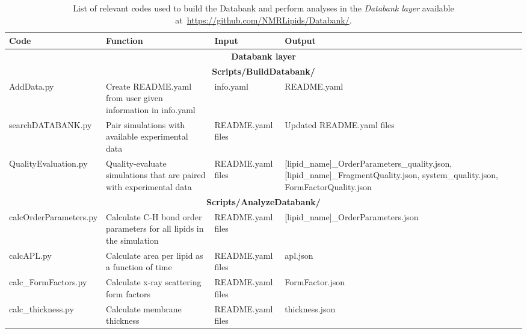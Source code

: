 \documentclass[fleqn,10pt]{wlscirepSI}
\begin{document}
\begin{table}[!h]
    \centering
    \begin{tabular}{p{3.0cm}  p{5.0cm}  p{3.0cm}  p{4.0cm}}
        Code & Function & Input & Output \\
        \hline
        \multicolumn{4}{c}{ {\bf Databank layer}}\\
        \hline
        \multicolumn{4}{c}{ {\bf Scripts/BuildDatabank/ }}\\
         AddData.py & Create README.yaml from user given information in info.yaml  & info.yaml & README.yaml \\
         searchDATABANK.py & Pair simulations with available experimental data  & README.yaml files & Updated README.yaml files \\
         QualityEvaluation.py & Quality-evaluate simulations that are paired with experimental data  & README.yaml files & [lipid\_name]\_OrderParameters\_quality.json, [lipid\_name]\_FragmentQuality.json, system\_quality.json, FormFactorQuality.json \\
         \multicolumn{4}{c}{ {\bf Scripts/AnalyzeDatabank/ }}\\
         calcOrderParameters.py & Calculate C-H bond order parameters for all lipids in the simulation & README.yaml files & [lipid\_name]\_OrderParameters.json \\
         calcAPL.py & Calculate area per lipid as a function of time & README.yaml files & apl.json \\
         calc\_FormFactors.py & Calculate x-ray scattering form factors & README.yaml files & FormFactor.json \\
         calc\_thickness.py & Calculate membrane thickness & README.yaml files & thickness.json \\
         
    \end{tabular}
    \caption{List of relevant codes used to build the Databank and perform analyses in the {\it Databank layer} available at~\url{https://github.com/NMRLipids/Databank/}.}
    \label{tab:codes}
\end{table}
\end{document}
